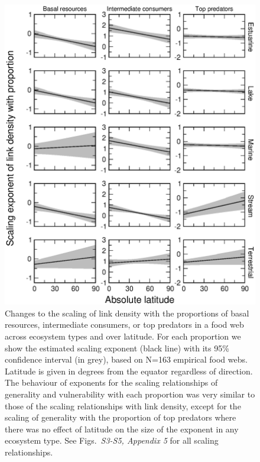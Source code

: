 \documentclass[12pt]{article}
\begin{document}
\begin{figure}[!H]
\centerline{\includegraphics*[height=.65\textheight]{Figures/by_TL/marginal/BIT_marginal_latitude.eps}}
\caption{Changes to the scaling of link density with the proportions of basal resources, intermediate
consumers, or top predators in a food web across ecosystem types and over latitude. For each proportion
we show the estimated scaling exponent (black line) with its 95\% confidence interval (in grey), based
on N=163 empirical food webs. Latitude is given in degrees from the equator regardless of direction. 
The behaviour of exponents for the scaling relationships of generality and vulnerability with each 
proportion was very similar to those of the scaling relationships with link density, except for the 
scaling of generality with the proportion of top predators where there was no effect of latitude on the 
size of the exponent in any ecosystem type. See Figs.~\emph{S3-S5, Appendix 5} for all scaling relationships.}
\label{BIT}
\end{figure}
\end{document}
